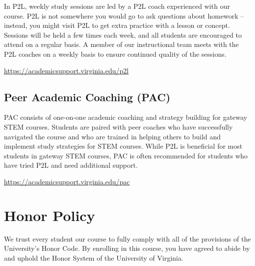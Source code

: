 \documentclass[12pt]{article}
\begin{document}
        In P2L, weekly study sessions are led by a P2L coach experienced with our course. P2L is not somewhere you would go to ask questions about homework – instead, you might visit P2L to get extra practice with a lesson or concept. Sessions will be held a few times each week, and all students are encouraged to attend on a regular basis. A member of our instructional team meets with the P2L coaches on a weekly basis to ensure continued quality of the sessions.

        \href{https://academicsupport.virginia.edu/p2l}{https://academicsupport.virginia.edu/p2l}
        
        \subsection{Peer Academic Coaching (PAC)}
        
        PAC consists of one-on-one academic coaching and strategy building for gateway STEM courses. Students are paired with peer coaches who have successfully navigated the course and who are trained in helping others to build and implement study strategies for STEM courses. While P2L is beneficial for most students in gateway STEM courses, PAC is often recommended for students who have tried P2L and need additional support.

        \href{https://academicsupport.virginia.edu/pac}{https://academicsupport.virginia.edu/pac}



    

    \section{Honor Policy}

    We trust every student our course to fully comply with all of the provisions of the University’s Honor Code. By enrolling in this course, you have agreed to abide by and uphold the Honor System of the University of Virginia.
\end{document}
